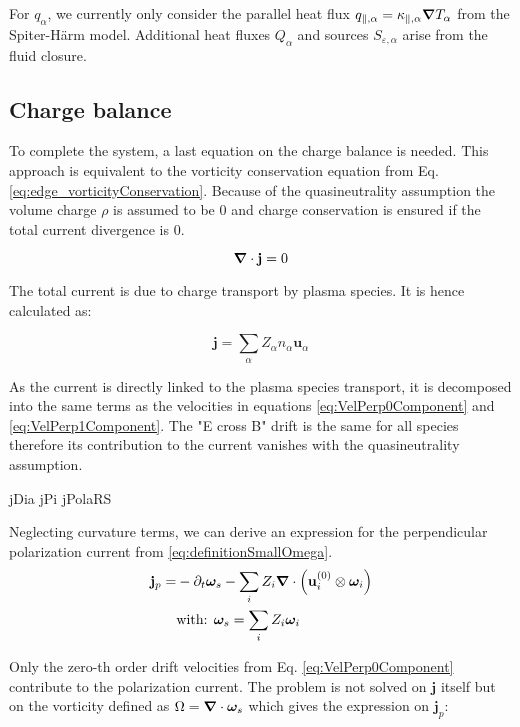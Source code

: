 For $q_\alpha$, we currently only consider the parallel heat flux $q_{\parallel,\alpha} = \kappa_{\parallel,\alpha}\grad T_\alpha$ from the Spiter-Härm model. Additional heat fluxes $Q_\alpha$ and sources $S_{\varepsilon,\alpha}$ arise from the fluid closure.



\subsection{Charge balance}

To complete the system, a last equation on the charge balance is needed. This approach is equivalent to the vorticity conservation equation from Eq. \ref{eq:edge_vorticityConservation}. Because of the quasineutrality assumption the volume charge $\rho$ is assumed to be 0 and charge conservation is ensured if the total current divergence is 0.

\begin{equation}
	\grad\cdot\mathbf{j} = 0
\end{equation}

The total current is due to charge transport by plasma species. It is hence calculated as: 

\begin{equation}
	\mathbf{j} = \sum_{\alpha} Z_\alpha n_\alpha \mathbf{u}_\alpha
\end{equation}

As the current is directly linked to the plasma species transport, it is decomposed into the same terms as the velocities in equations \ref{eq:VelPerp0Component} and \ref{eq:VelPerp1Component}. The "E cross B" drift is the same for all species therefore its contribution to the current vanishes with the quasineutrality assumption. 

jDia
jPi
jPolaRS

Neglecting curvature terms, we can derive an expression for the perpendicular polarization current from \autoref{eq:definitionSmallOmega}.
\begin{align}
	\mathbf{j}_{p} =& -\partial_t\boldsymbol{\omega}_s - \sum_{i}Z_i\grad\cdot\left(\mathbf{u}^{(0)}_i\otimes\boldsymbol{\omega}_i\right) \\
	&\text{with:  }\boldsymbol{\omega}_s = \sum_{i}Z_i\boldsymbol{\omega}_i \nonumber
\end{align}


 Only the zero-th order drift velocities from Eq. \ref{eq:VelPerp0Component} contribute to the polarization current. The problem is not solved on $\mathbf{j}$ itself but on the vorticity defined as $\Omega = \grad\cdot\boldsymbol{\omega}_s$ which gives the expression on $\mathbf{j}_p$: 
 
